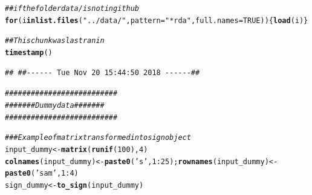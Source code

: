 \documentclass{article}\usepackage[]{graphicx}\usepackage[]{color}
\makeatletter
\newcommand{\hlnum}[1]{\textcolor[rgb]{0.686,0.059,0.569}{#1}}%
\newcommand{\hlstr}[1]{\textcolor[rgb]{0.192,0.494,0.8}{#1}}%
\newcommand{\hlcom}[1]{\textcolor[rgb]{0.678,0.584,0.686}{\textit{#1}}}%
\newcommand{\hlopt}[1]{\textcolor[rgb]{0,0,0}{#1}}%
\newcommand{\hlstd}[1]{\textcolor[rgb]{0.345,0.345,0.345}{#1}}%
\newcommand{\hlkwa}[1]{\textcolor[rgb]{0.161,0.373,0.58}{\textbf{#1}}}%
\newcommand{\hlkwb}[1]{\textcolor[rgb]{0.69,0.353,0.396}{#1}}%
\newcommand{\hlkwc}[1]{\textcolor[rgb]{0.333,0.667,0.333}{#1}}%
\newcommand{\hlkwd}[1]{\textcolor[rgb]{0.737,0.353,0.396}{\textbf{#1}}}%
\newenvironment{kframe}{%
 \def\at@end@of@kframe{}%
 \ifinner\ifhmode%
  \def\at@end@of@kframe{\end{minipage}}%
  \begin{minipage}{\columnwidth}%
 \fi\fi%
 \def\FrameCommand##1{\hskip\@totalleftmargin \hskip-\fboxsep
 \colorbox{shadecolor}{##1}\hskip-\fboxsep
     \hskip-\linewidth \hskip-\@totalleftmargin \hskip\columnwidth}%
 \MakeFramed {\advance\hsize-\width
   \@totalleftmargin\z@ \linewidth\hsize
   \@setminipage}}%
 {\par\unskip\endMakeFramed%
 \at@end@of@kframe}
\newenvironment{knitrout}{}{} %
\makeatother
\begin{document}
\begin{knitrout}
\color{fgcolor}\begin{kframe}
\begin{alltt}
\hlcom{## if the folder data/ is not in github}
\hlkwa{for}\hlstd{(i} \hlkwa{in} \hlkwd{list.files}\hlstd{(}\hlstr{"../data/"}\hlstd{,} \hlkwc{pattern} \hlstd{=} \hlstr{"*rda"}\hlstd{,} \hlkwc{full.names} \hlstd{=} \hlnum{TRUE}\hlstd{))\{}\hlkwd{load}\hlstd{(i)\}}
\end{alltt}
\end{kframe}
\end{knitrout}

\begin{knitrout}
\color{fgcolor}\begin{kframe}
\begin{alltt}
\hlcom{## This chunk was last ran in}
\hlkwd{timestamp}\hlstd{()}
\end{alltt}
\begin{verbatim}
## ##------ Tue Nov 20 15:44:50 2018 ------##
\end{verbatim}
\begin{alltt}
\hlcom{##########################}
\hlcom{####### Dummy data #######}
\hlcom{##########################}

\hlcom{### Example of matrix transformed into sign object}
\hlstd{input_dummy} \hlkwb{<-} \hlkwd{matrix}\hlstd{(}\hlkwd{runif}\hlstd{(}\hlnum{100}\hlstd{),} \hlnum{4}\hlstd{)}
\hlkwd{colnames}\hlstd{(input_dummy)} \hlkwb{<-} \hlkwd{paste0}\hlstd{(}\hlstr{'s'}\hlstd{,} \hlnum{1}\hlopt{:}\hlnum{25}\hlstd{);} \hlkwd{rownames}\hlstd{(input_dummy)} \hlkwb{<-} \hlkwd{paste0}\hlstd{(}\hlstr{'sam'}\hlstd{,} \hlnum{1}\hlopt{:}\hlnum{4}\hlstd{)}
\hlstd{sign_dummy} \hlkwb{<-} \hlkwd{to_sign}\hlstd{(input_dummy)}
\end{alltt}
\end{kframe}
\end{knitrout}
\end{document}
